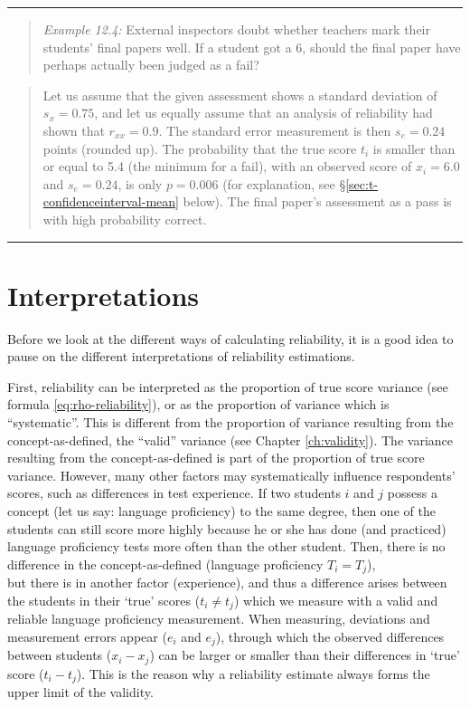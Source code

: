 \documentclass[
]{book}
\begin{document}
\begin{center}\rule{0.5\linewidth}{0.5pt}\end{center}

\begin{quote}
\emph{Example 12.4:}
External inspectors doubt whether teachers mark their students' final
papers well. If a student got a 6, should the final paper have perhaps actually
been judged as a fail?
\end{quote}

\begin{quote}
Let us assume that the given assessment shows a standard deviation
of \(s_x=0.75\), and let us equally assume that an analysis of reliability
had shown that \(r_{xx}=0.9\). The standard error measurement is then \(s_e = 0.24\)
points (rounded up). The probability that the true score \(t_i\) is smaller than
or equal to 5.4 (the minimum for a fail), with an observed
score of \(x_i=6.0\) and \(s_e=0.24\), is only \(p=0.006\) (for explanation,
see §\ref{sec:t-confidenceinterval-mean} below). The
final paper's assessment as a pass is with high probability correct.
\end{quote}

\begin{center}\rule{0.5\linewidth}{0.5pt}\end{center}

\hypertarget{interpretations}{%
\section{Interpretations}\label{interpretations}}

Before we look at the different ways of calculating
reliability, it is a good idea to pause on the different
interpretations of reliability estimations.

First, reliability can be interpreted as the proportion of
true score variance (see formula \eqref{eq:rho-reliability}), or
as the proportion of variance which is ``systematic''.
This is different from the proportion of variance resulting from the concept-as-defined,
the ``valid'' variance (see Chapter \ref{ch:validity}).
The variance resulting from the concept-as-defined is part of the proportion of
true score variance.
However, many other factors may systematically influence
respondents' scores, such as differences in test experience. If two students \(i\) and \(j\)
possess a concept (let us say: language proficiency) to the same degree, then one of the
students can still score more highly because he or she has done (and practiced) language proficiency
tests more often than the other student. Then, there is no difference
in the concept-as-defined (language proficiency \(T_i = T_j\)),\\
but there is in another factor (experience), and thus a difference arises
between the students in their `true' scores (\(t_i \neq t_j\)) which
we measure with a valid and reliable language proficiency measurement. When measuring,
deviations and measurement errors appear (\(e_i\) and \(e_j\)), through which
the observed differences between students (\(x_i-x_j\)) can be larger or smaller than their
differences in `true' score (\(t_i-t_j\)).
This is the reason why a reliability estimate always forms the upper limit of
the validity.
\end{document}
